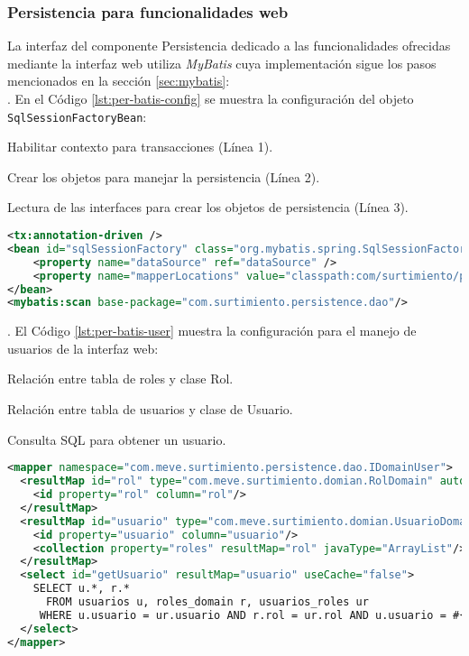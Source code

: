 \subsubsection{Persistencia para funcionalidades web}\label{sec:persistence-web}
La interfaz del componente Persistencia dedicado a las funcionalidades ofrecidas mediante la interfaz web utiliza \textit{MyBatis} cuya implementación sigue los pasos mencionados en la sección \ref{sec:mybatis}:\\
. En el Código \ref{lst:per-batis-config} se muestra la configuración del objeto \texttt{SqlSessionFactoryBean}: 
\begin{enumerate}
	{\setlength\itemindent{25pt}\item Habilitar contexto para transacciones (Línea 1).}
	{\setlength\itemindent{25pt}\item Crear los objetos para manejar la persistencia (Línea 2).}
	{\setlength\itemindent{25pt}\item Lectura de las interfaces para crear los objetos de persistencia (Línea 3).}
\end{enumerate}
\begin{lstlisting}[language=XML, caption={Configuración de \textit{MyBatis} con \textit{Spring}.}, captionpos=b, label={lst:per-batis-config}]
<tx:annotation-driven />
<bean id="sqlSessionFactory" class="org.mybatis.spring.SqlSessionFactoryBean">
	<property name="dataSource" ref="dataSource" />
	<property name="mapperLocations" value="classpath:com/surtimiento/persistence/dao/*.xml" />
</bean>
<mybatis:scan base-package="com.surtimiento.persistence.dao"/>
\end{lstlisting}

. El Código \ref{lst:per-batis-user} muestra la configuración para el manejo de usuarios de la interfaz web:
\begin{enumerate}
	{\setlength\itemindent{25pt}\item Relación entre tabla de roles y clase Rol.}
	{\setlength\itemindent{25pt}\item Relación entre tabla de usuarios y clase de Usuario.}
	{\setlength\itemindent{25pt}\item Consulta SQL para obtener un usuario.}
\end{enumerate}
\begin{lstlisting}[language=XML, caption={Definición de relación de \textit{MyBatis}.}, label={
lst:per-batis-user}]
<mapper namespace="com.meve.surtimiento.persistence.dao.IDomainUser">
  <resultMap id="rol" type="com.meve.surtimiento.domian.RolDomain" autoMapping="true">
    <id property="rol" column="rol"/>
  </resultMap>
  <resultMap id="usuario" type="com.meve.surtimiento.domian.UsuarioDomain" autoMapping="true">
    <id property="usuario" column="usuario"/>
    <collection property="roles" resultMap="rol" javaType="ArrayList"/>
  </resultMap>
  <select id="getUsuario" resultMap="usuario" useCache="false">
    SELECT u.*, r.*
      FROM usuarios u, roles_domain r, usuarios_roles ur
     WHERE u.usuario = ur.usuario AND r.rol = ur.rol AND u.usuario = #{0};
  </select>
</mapper>
\end{lstlisting}

